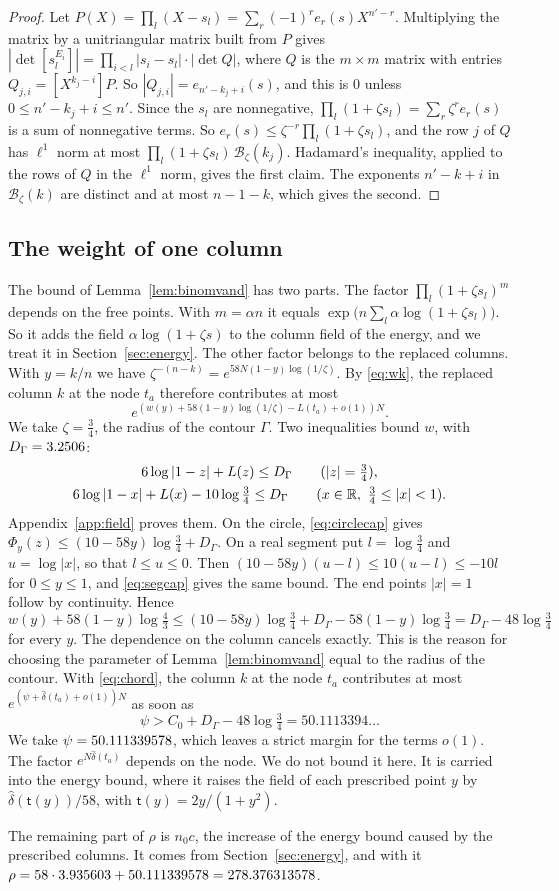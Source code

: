 \begin{proof}
Let $P(X)=\prod_l(X-s_l)=\sum_r(-1)^re_r(s)X^{n'-r}$. Multiplying the matrix by a unitriangular matrix built
from $P$ gives $|\det[s_l^{E_i}]|=\prod_{i<l}|s_i-s_l|\cdot|\det Q|$, where $Q$ is the $m\times m$ matrix with
entries $Q_{j,i}=[X^{k_j-i}]P$. So $|Q_{j,i}|=e_{n'-k_j+i}(s)$, and this is $0$ unless $0\le n'-k_j+i\le n'$.
Since the $s_l$ are nonnegative, $\prod_l(1+\zeta s_l)=\sum_r\zeta^re_r(s)$ is a sum of nonnegative terms. So
$e_r(s)\le\zeta^{-r}\prod_l(1+\zeta s_l)$, and the row $j$ of $Q$ has $\ell^1$ norm at most
$\prod_l(1+\zeta s_l)\,\mathcal B_\zeta(k_j)$. Hadamard's inequality, applied to the rows of $Q$ in the $\ell^1$ norm,
gives the first claim. The exponents $n'-k+i$ in $\mathcal B_\zeta(k)$ are distinct and at most $n-1-k$, which gives the
second.
\end{proof}

\subsection{The weight of one column}\label{ssec:weights}
The bound of Lemma~\ref{lem:binomvand} has two parts. The factor $\prod_l(1+\zeta s_l)^m$ depends on the free points.
With $m=\alpha n$ it equals $\exp\bigl(n\sum_l\alpha\log(1+\zeta s_l)\bigr)$. So it adds the field
$\alpha\log(1+\zeta s)$ to the column field of the energy, and we treat it in Section~\ref{sec:energy}. The other factor
belongs to the replaced columns. With $y=k/n$ we have $\zeta^{-(n-k)}=e^{58N(1-y)\log(1/\zeta)}$. By \eqref{eq:wk}, the
replaced column $k$ at the node $t_a$ therefore contributes at most
\[
 e^{(w(y)+58(1-y)\log(1/\zeta)-L(t_a)+o(1))N}.
\]
We take $\zeta=\frac34$, the radius of the contour $\Gamma$. Two inequalities bound $w$, with $D_\Gamma=3.2506$:
\begin{gather}
 6\log|1-z|+L(z)\le D_\Gamma\qquad(|z|=\tfrac34),\label{eq:circlecap}\\
 6\log|1-x|+L(x)-10\log\tfrac34\le D_\Gamma\qquad(x\in\R,\ \tfrac34\le|x|<1).\label{eq:segcap}
\end{gather}
Appendix~\ref{app:field} proves them. On the circle, \eqref{eq:circlecap} gives
$\Phi_y(z)\le(10-58y)\log\frac34+D_\Gamma$. On a real segment put $l=\log\frac34$ and $u=\log|x|$, so that $l\le u\le0$.
Then $(10-58y)(u-l)\le10(u-l)\le-10l$ for $0\le y\le1$, and \eqref{eq:segcap} gives the same bound. The end points
$|x|=1$ follow by continuity. Hence
\[
 w(y)+58(1-y)\log\tfrac43\le(10-58y)\log\tfrac34+D_\Gamma-58(1-y)\log\tfrac34=D_\Gamma-48\log\tfrac34
\]
for every $y$. The dependence on the column cancels exactly. This is the reason for choosing the parameter of
Lemma~\ref{lem:binomvand} equal to the radius of the contour. With \eqref{eq:chord}, the column $k$ at the node $t_a$
contributes at most $e^{(\psi+\hat\delta(t_a)+o(1))N}$ as soon as
\[
 \psi>C_0+D_\Gamma-48\log\tfrac34=50.1113394\ldots
\]
We take $\psi=50.111339578$, which leaves a strict margin for the terms $o(1)$. The factor $e^{N\hat\delta(t_a)}$ depends on the
node. We do not bound it here. It is carried into the energy bound, where it raises the field of each prescribed point
$y$ by $\hat\delta(\mathsf t(y))/58$, with $\mathsf t(y)=2y/(1+y^2)$.

The remaining part of $\rho$ is $n_0c$, the increase of the energy bound caused by the prescribed
columns. It comes from Section~\ref{sec:energy}, and with it $\rho=58\cdot3.935603+50.111339578=278.376313578$.
